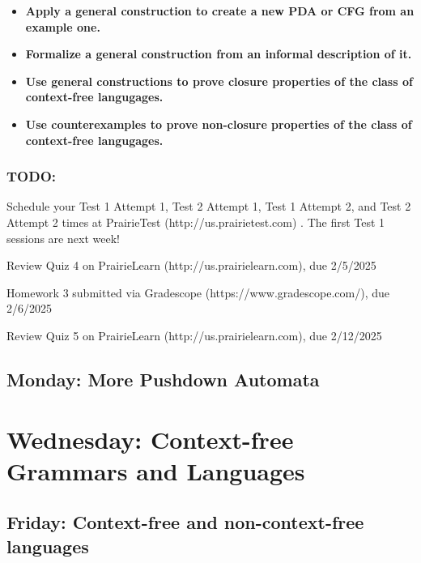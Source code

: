 \begin{itemize}
\begin{itemize}
        \begin{itemize}
            \item {\bf Apply a general construction to create a new PDA or CFG from an example one.}
            \item {\bf Formalize a general construction from an informal description of it.}
            \item {\bf Use general constructions to prove closure properties of the class of context-free langugages.}
            \item {\bf Use counterexamples to prove non-closure properties of the class of context-free langugages.}
        \end{itemize}
    \end{itemize}
\end{itemize}

\vspace{-20pt}

\subsubsection*{TODO:}
\begin{list}{\itemsep-10pt}
   \item Schedule your Test 1 Attempt 1, Test 2 Attempt 1, Test 1 Attempt 2, and Test 2 Attempt 2 times
   at PrairieTest (http://us.prairietest.com) . The first Test 1 sessions are next week!
   \item Review Quiz 4 on PrairieLearn (http://us.prairielearn.com), due 2/5/2025
   \item Homework 3 submitted via Gradescope (https://www.gradescope.com/), due 2/6/2025
   \item Review Quiz 5 on PrairieLearn (http://us.prairielearn.com), due 2/12/2025
\end{list}

\newpage



\newpage
\subsection*{Monday: More Pushdown Automata}



\newpage
\section*{Wednesday: Context-free Grammars and Languages}


    
\newpage
\subsection*{Friday: Context-free and non-context-free languages}






